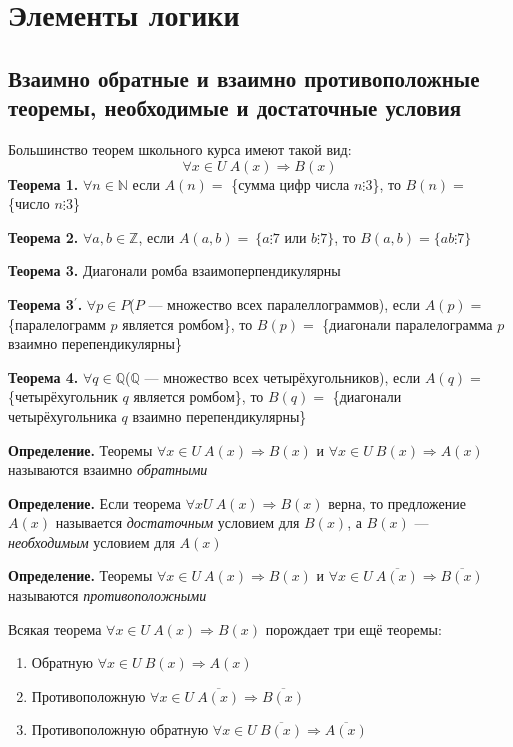 \documentclass{article}
\begin{document}
    \section{Элементы логики}

    \subsection{Взаимно обратные и взаимно противоположные теоремы, необходимые и достаточные условия}

    Большинство теорем школьного курса имеют такой вид:
    \[\forall x \in U\ A(x) \Rightarrow B(x)\]
    \textbf{Теорема 1.} \(\forall n \in \mathbb{N}\) если \(A(n)=\) \{сумма цифр числа \(n \vdots 3\)\}, то \(B(n)=\) \{число \(n \vdots 3\)\}

    \textbf{Теорема 2.} \(\forall a, b \in \mathbb{Z}\), если \(A(a,b)=\ \{a \vdots 7\) или \(b \vdots 7\}\), то \(B(a,b)=\{ab \vdots 7\}\)

    \textbf{Теорема 3.} Диагонали ромба взаимоперпендикулярны

    \textbf{Теорема 3\(^\prime\).} \(\forall p \in P\)(\(P\) --- множество всех паралеллограммов), если \(A(p)=\) \{паралелограмм \(p\) является ромбом\}, то \(B(p)=\) \{диагонали паралелограмма \(p\) взаимно перепендикулярны\}

    \textbf{Теорема 4.} \(\forall q \in \mathbb{Q}\)(\(\mathbb{Q}\) --- множество всех четырёхугольников), если \(A(q)=\) \{четырёхугольник \(q\) является ромбом\}, то \(B(q)=\) \{диагонали четырёхугольника \(q\) взаимно перепендикулярны\}

    \textbf{Определение.} Теоремы \(\forall x \in U\ A(x) \Rightarrow B(x)\) и \(\forall x \in U\ B(x) \Rightarrow A(x)\) называются взаимно \textit{обратными}

    \textbf{Определение.} Если теорема \(\forall x U\ A(x) \Rightarrow B(x)\) верна, то предложение \(A(x)\) называется \textit{достаточным} условием для \(B(x)\), а \(B(x)\) --- \textit{необходимым} условием для \(A(x)\)

    \textbf{Определение.} Теоремы \(\forall x \in U\ A(x) \Rightarrow B(x)\) и \(\forall x \in U\ \overline{A(x)} \Rightarrow \overline{B(x)}\) называются \textit{противоположными}

    Всякая теорема \(\forall x \in U\ A(x) \Rightarrow B(x)\) порождает три ещё теоремы:
    \begin{enumerate}
        \item Обратную \(\forall x \in U\ B(x) \Rightarrow A(x)\)
        \item Противоположную \(\forall x \in U\ \overline{A(x)} \Rightarrow \overline{B(x)}\)
        \item Противоположную обратную \(\forall x \in U\ \overline{B(x)} \Rightarrow \overline{A(x)}\)
    \end{enumerate}
\end{document}
